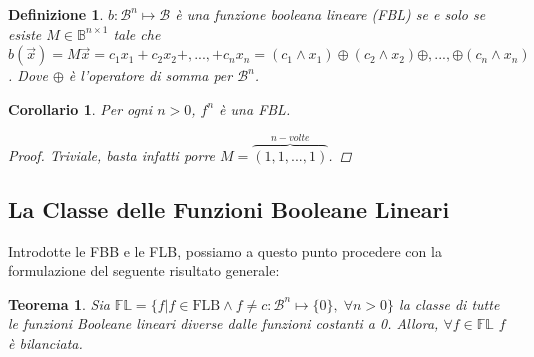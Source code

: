 \documentclass[12pt,a4paper,openright]{report}
\newcommand*\xor{\mathbin{\oplus}}
\newtheorem{mydef}{Definizione}[chapter]
\newtheorem*{mycor}{Corollario}
\newtheorem{mythm}{Teorema}[chapter]
\begin{document}
\begin{mydef}
$b:\mathcal{B}^n \mapsto \mathcal{B}$ è una funzione booleana lineare (FBL) se e solo se esiste $M \in \mathbb{B}^{n \times 1}$ tale che $b(\vec{x})=M\vec{x}=c_1x_1+c_2x_2+,...,+c_nx_n=(c_1\land{x_1})\xor(c_2\land{x_2})\xor,...,\xor(c_n\land{x_n})$. Dove $\xor$
è l'operatore di somma per $\mathcal{B}^n$. 
\end{mydef}
\begin{mycor}
    Per ogni $n>0$, $f^n$ è una FBL.
    \begin{proof}
        Triviale, basta infatti porre $M=\overbrace{(1,1,...,1)}^{n-volte}$.
    \end{proof}
\end{mycor}

\subsection{La Classe delle Funzioni Booleane Lineari}
Introdotte le FBB e le FLB, possiamo a questo punto procedere con la formulazione del seguente risultato generale:
\begin{mythm}
    Sia $\mathbb{FL}=\{f|f\in\text{FLB} \land f \neq c:\mathcal{B}^n\mapsto\{0\},\;\forall n > 0\}$ la classe di tutte le funzioni Booleane lineari
    diverse dalle funzioni costanti a 0. Allora, $\forall f\in \mathbb{FL}$ $f$ è bilanciata.
\end{mythm}
\end{document}
